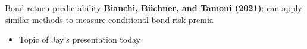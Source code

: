 \documentclass[xcolor=table, aspectratio=169]{beamer}
\newcommand{\alertbf}[1]{\alert{\textbf{#1}}}
\begin{document}
\begin{frame}[t]{Bond return predictability}
\alertbf{Bianchi, Büchner, and Tamoni (2021)}: can apply similar methods to measure conditional bond risk premia
    \begin{itemize}
        \item Topic of Jay's presentation today
    \end{itemize}
\end{frame}

\end{document}
